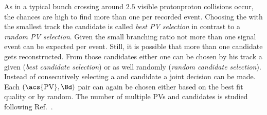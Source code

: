 As in a typical \LHCb bunch crossing around $\num{2.5}$ visible
\acl{protonproton} collisions occur, the chances are high to find more than one
\PV per recorded event. Choosing the \PV with the smallest \DTF track \IP
\chisqndf \wrt the \Bd candidate is called \emph{best PV selection} in contrast
to a \emph{random PV selection}. Given the small \BdToJpsiKS branching ratio not
more than one signal event can be expected per event. Still, it is possible that
more than one candidate gets reconstructed. From those candidates either one can
be chosen by his \DTF track \IP \chisqndf \wrt a given \PV (\emph{best
\Bd candidate selection}) or as well randomly (\emph{random \Bd candidate
selection}). Instead of consecutively selecting a \PV and \Bmeson candidate a
joint decision can be made. Each $(\text{\acs{PV}}, \Bd)$ pair can again be
chosen either based on the best fit quality or by random. The number of multiple
\acp{PV} and candidates is studied following Ref.~\cite{Koppenburg:1340942}.

